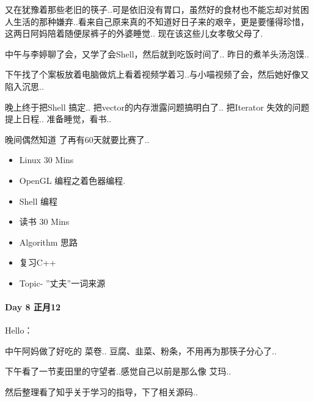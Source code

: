 \documentclass[UTF8,a4paper,8pt]{ctexart}
\begin{document}
	 	 又在犹豫着那些老旧的筷子..可是依旧没有胃口，虽然好的食材也不能忘却对贫困人生活的那种嫌弃..看来自己原来真的不知道好日子来的艰辛，更是要懂得珍惜，这两日阿妈陪着随便尿裤子的外婆睡觉.. 现在该这些儿女孝敬父母了.
	 	 
	 	 中午与李婷聊了会，又学了会Shell，然后就到吃饭时间了.. 昨日的煮羊头汤泡馍..
	 	 
	 	 下午找了个案板放着电脑做炕上看着视频学着习..与小喵视频了会，然后她好像又陷入沉思..
	 	 
	 	 晚上终于把Shell 搞定.. 把vector的内存泄露问题搞明白了.. 把Iterator 失效的问题提上日程.. 准备睡觉，看书..
	 	 
	 	 晚间偶然知道 了再有60天就要比赛了..
	 	 \begin{itemize}
	 	 	\item  \makebox[0pt][l]{$\square$}\raisebox{.15ex}{\hspace{0.1em}$\checkmark$} Linux 30 Mins
	 	 	\item  OpenGL 编程之着色器编程.
	 	 	\item  \makebox[0pt][l]{$\square$}\raisebox{.15ex}{\hspace{0.1em}$\checkmark$} Shell 编程
	 	 	
	 	 	\item  \makebox[0pt][l]{$\square$}\raisebox{.15ex}{\hspace{0.1em}$\checkmark$} 读书  30 Mins		 	 
	 	 	\item  \makebox[0pt][l]{$\square$}\raisebox{.15ex}{\hspace{0.1em}$\checkmark$} Algorithm 思路
	 	 	\item  \makebox[0pt][l]{$\square$}\raisebox{.15ex}{\hspace{0.1em}$\checkmark$} 复习C++ 
	 	 	
	 	 	\item  \makebox[0pt][l]{$\square$}\raisebox{.15ex}{\hspace{0.1em}$\checkmark$} Topic- ”丈夫”一词来源
	 	 \end{itemize}
 	 \paragraph{Day 8   正月12       }Hello：
 	 
	 	 中午阿妈做了好吃的 菜卷.. 豆腐、韭菜、粉条，不用再为那筷子分心了..
	 	 
	 	 下午看了一节麦田里的守望者..感觉自己以前是那么像 艾玛..
	 	 
		 然后整理看了知乎关于学习的指导，下了相关源码..
		 
\end{document}
